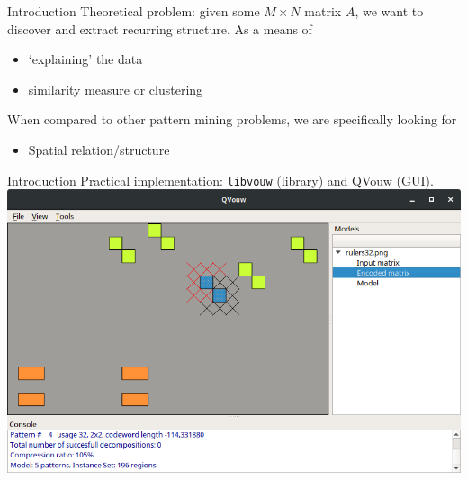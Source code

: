 \documentclass[11pt]{beamer}
\begin{document}

\begin{frame}{Introduction}
Theoretical problem: given some $M\times N$ matrix $A$, we want to discover and extract recurring structure. As a means of
\begin{itemize}
\item `explaining' the data
\item similarity measure or clustering 
\end{itemize}
When compared to other pattern mining problems, we are specifically looking for
\begin{itemize}
\item Spatial relation/structure
\end{itemize}
\end{frame}


\begin{frame}{Introduction}
Practical implementation: \texttt{libvouw} (library) and QVouw (GUI).\\[3em]

\centering
\includegraphics[width=.5\paperwidth]{"qvouw"} 

\end{frame}

\end{document}
